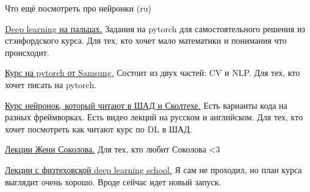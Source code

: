 \documentclass[notes,12pt, aspectratio=169]{beamer}
\newenvironment{wideitemize}{\itemize\addtolength{\itemsep}{10pt}}{\enditemize}
\begin{document}
\begin{frame}{Что ещё посмотреть  про нейронки (ru)}
\begin{wideitemize} 
\item  \href{https://dlcourse.ai}{Deep learning на пальцах.} Задания на pytorch для самостоятельного решения из стэнфордского курса.   \alert{Для тех, кто  хочет мало математики и понимания что происходит.}

\item \href{https://stepik.org/course/50352/syllabus}{Курс на pytorch от Samsung.}  Состоит из двух частей: CV и NLP. \alert{Для тех, кто  хочет писать на pytorch.}

\item  \href{https://github.com/yandexdataschool/Practical_DL/tree/master}{Курс нейронок, который читают в ШАД и Сколтехе.} Есть варианты кода на разных фреймворках. Есть видео лекций на русском и английском. \alert{Для тех, кто хочет посмотреть как читают курс по DL  в ШАД.}

\item \href{https://www.youtube.com/watch?v=62sP9QKYrgI&list=PLEwK9wdS5g0qa3PIhR6HBDJD_QnrfP8Ei}{Лекции Жени Соколова.}  \alert{Для тех, кто любит Соколова <3}
 
\item \href{https://www.youtube.com/@DeepLearningSchool/playlists}{Лекции с физтеховской deep learning school.} \alert{Я сам не проходил, но план курса выглядит очень хорошо. Вроде сейчас идет новый запуск.}


\end{wideitemize} 
\end{frame} 
\end{document}
